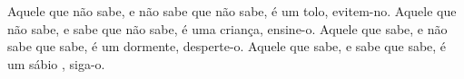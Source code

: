 
\begin{dedicatoria}%

    Aquele que não sabe, e não sabe que não sabe, é um tolo, evitem-no. Aquele que não sabe, e sabe que não sabe, é uma criança, ensine-o. Aquele que sabe, e não sabe que sabe, é um dormente, desperte-o. Aquele que sabe, e sabe que sabe, é um sábio , siga-o.

\end{dedicatoria}
